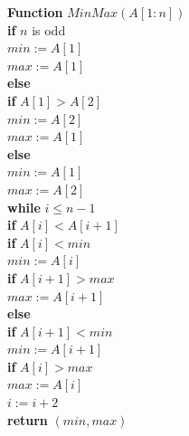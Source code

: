 \documentclass[11pt]{article}
\begin{document}
\textbf{Function} $MinMax(A[1:n])$\\
\-\hspace{3em} \textbf{if} $n$ is odd\\
\-\hspace{5em} $min := A[1]$\\
\-\hspace{5em} $max := A[1]$\\
\-\hspace{3em} \textbf{else}\\ 
\-\hspace{5em} \textbf{if} $A[1] > A[2]$\\
\-\hspace{7em} $min := A[2]$\\
\-\hspace{7em} $max := A[1]$\\
\-\hspace{5em} \textbf{else}\\ 
\-\hspace{7em} $min := A[1]$\\
\-\hspace{7em} $max := A[2]$\\
\-\hspace{3em} \textbf{while} $i \leq n-1$\\
\-\hspace{5em} \textbf{if} $A[i] < A[i+1]$\\
\-\hspace{7em} \textbf{if} $A[i] < min$\\
\-\hspace{9em} $min := A[i]$\\
\-\hspace{7em} \textbf{if} $A[i+1] > max$\\
\-\hspace{9em} $max := A[i+1]$\\
\-\hspace{5em} \textbf{else}\\
\-\hspace{7em} \textbf{if} $A[i+1] < min$\\
\-\hspace{9em} $min := A[i+1]$\\
\-\hspace{7em} \textbf{if} $A[i] > max$\\
\-\hspace{9em} $max := A[i]$\\
\-\hspace{5em} $i := i+2$\\
\-\hspace{3em} \textbf{return} $(min, max)$\\
\end{document}
